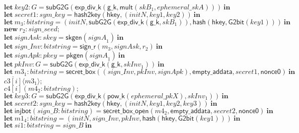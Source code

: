 \documentclass{article}
\newcommand{\cinput}[2]{{#1}({#2})}
\newcommand{\coutput}[2]{\overline{#1}\langle{#2}\rangle}
\newcommand{\kw}[1]{\mathbf{#1}}
\newcommand{\kwf}[1]{\mathsf{#1}}
\newcommand{\var}[1]{\mathit{#1}}
\newcommand{\kwt}[1]{\mathit{#1}}
\newcommand{\kwc}[1]{\mathit{#1}}
\begin{document}
\begin{tabbing}
\>$\quad \kw{let}\ \var{key2}: \kwt{G} = \kwf{subG2G}(\kwf{exp{\_}div{\_}k}(\kwf{g{\_}k}, \kwf{mult}(\var{skB}_{1}, \var{ephemeral{\_}skA})))\ \kw{in}$\\
\>$\quad \kw{let}\ \var{secret1}: \kwt{sym{\_}key} = \kwf{hash2key}(\kwf{hkey}, \kwf{}(\var{initN}, \var{key1}, \var{key2}))\ \kw{in}$\\
\>$\quad \kw{let}\ \var{m}_{3}: \kwt{bitstring} = \kwf{}(\var{initN}, \kwf{subG2G}(\kwf{exp{\_}div{\_}k}(\kwf{g{\_}k}, \var{skB}_{1})), \kwf{hash}(\kwf{hkey}, \kwf{G2bit}(\var{key1})))\ \kw{in}$\\
\>$\quad \kw{new}\ \var{r}_{2}: \kwt{sign{\_}seed};$\\
\>$\quad \kw{let}\ \var{signAsk}: \kwt{skey} = \kwf{skgen}(\var{signA}_{1})\ \kw{in}$\\
\>$\quad \kw{let}\ \var{sign{\_}Inv}: \kwt{bitstring} = \kwf{sign{\_}r}(\var{m}_{3}, \var{signAsk}, \var{r}_{2})\ \kw{in}$\\
\>$\quad \kw{let}\ \var{signApk}: \kwt{pkey} = \kwf{pkgen}(\var{signA}_{1})\ \kw{in}$\\
\>$\quad \kw{let}\ \var{pkInv}: \kwt{G} = \kwf{subG2G}(\kwf{exp{\_}div{\_}k}(\kwf{g{\_}k}, \var{skInv}_{1}))\ \kw{in}$\\
\>$\quad \kw{let}\ \var{m3}_{1}: \kwt{bitstring} = \kwf{secret{\_}box}(\kwf{}(\var{sign{\_}Inv}, \var{pkInv}, \var{signApk}), \kwf{empty{\_}addata}, \var{secret1}, \kwf{nonce0})\ \kw{in}$\\
\>$\quad \coutput{\kwc{c3}[\var{i}]}{\var{m3}_{1}};$\\
\>$\quad \cinput{\kwc{c4}[\var{i}]}{\var{m4}_{2}: \kwt{bitstring}};$\\
\>$\quad \kw{let}\ \var{key3}: \kwt{G} = \kwf{subG2G}(\kwf{exp{\_}div{\_}k}(\kwf{pow{\_}k}(\var{ephemeral{\_}pkX}), \var{skInv}_{1}))\ \kw{in}$\\
\>$\quad \kw{let}\ \var{secret2}: \kwt{sym{\_}key} = \kwf{hash2key}(\kwf{hkey}, \kwf{}(\var{initN}, \var{key1}, \var{key2}, \var{key3}))\ \kw{in}$\\
\>$\quad \kw{let}\ \kwf{injbot}(\var{sign{\_}B}: \kwt{bitstring}) = \kwf{secret{\_}box{\_}open}(\var{m4}_{2}, \kwf{empty{\_}addata}, \var{secret2}, \kwf{nonce0})\ \kw{in}$\\
\>$\quad \kw{let}\ \var{m1}_{4}: \kwt{bitstring} = \kwf{}(\var{initN}, \var{sign{\_}Inv}, \var{pkInv}, \kwf{hash}(\kwf{hkey}, \kwf{G2bit}(\var{key1})))\ \kw{in}$\\
\>$\quad \kw{let}\ \var{si1}: \kwt{bitstring} = \var{sign{\_}B}\ \kw{in}$\\

\end{tabbing}
\end{document}
